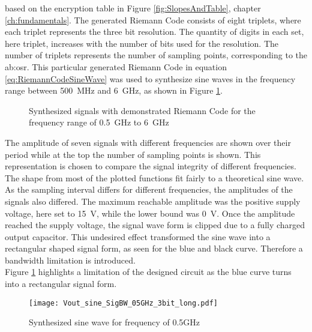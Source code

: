 based on the encryption table in Figure \ref{fig:SlopesAndTable}, chapter \ref{ch:fundamentals}.
The generated Riemann Code consists of eight triplets, where each triplet represents the three bit resolution.
The quantity of digits in each set, here triplet, increases with the number of bits used for the resolution.
The number of triplets represents the number of sampling points, corresponding to the \gls{ab:osr}.
This particular generated Riemann Code in equation \ref{eq:RiemannCodeSineWave} was used to synthesize sine waves in the frequency range between \SI{500}{\MHz} and \SI{6}{\GHz}, as shown in Figure \ref{fig:7SignalsSameSlopeInOnePlot}.

\begin{figure}[htb!]
   \centering 
   
   \caption{Synthesized signals with demonstrated Riemann Code for the frequency range of \SI{0.5}{\GHz} to \SI{6}{\GHz}}
   \label{fig:7SignalsSameSlopeInOnePlot}
\end{figure}

The amplitude of seven signals with different frequencies are shown over their period while at the top the number of sampling points is shown.
This representation is chosen to compare the signal integrity of different frequencies.
The shape from most of the plotted functions fit fairly to a theoretical sine wave.
As the sampling interval differs for different frequencies, the amplitudes of the signals also differed.
The maximum reachable amplitude was the positive supply voltage, here set to \SI{15}{\volt}, while the lower bound was \SI{0}{\volt}. 
Once the amplitude reached the supply voltage, the signal wave form is clipped due to a fully charged output capacitor.
This undesired effect transformed the sine wave into a rectangular shaped signal form, as seen for the blue and black curve.
Therefore a bandwidth limitation is introduced.\\
Figure \ref{fig:7SignalsSameSlopeInOnePlot} highlights a limitation of the designed circuit as the blue curve turns into a rectangular signal form.\\

\begin{figure}[htb!] %
   \centering
   \texttt{[image: Vout\_sine\_SigBW\_05GHz\_3bit\_long.pdf]}
   \caption{Synthesized sine wave for frequency of 0.5GHz}
   \label{fig:SineWave05GHz}
\end{figure}


